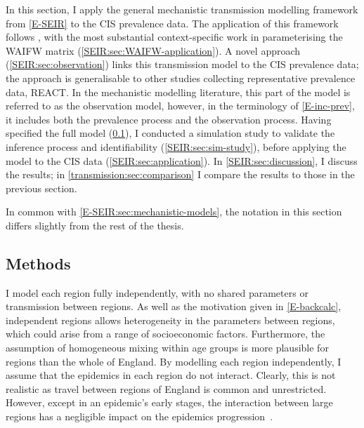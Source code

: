 \documentclass[thesis.tex]{subfiles}
\begin{document}
In this section, I apply the general mechanistic transmission modelling framework from \cref{E-SEIR} to the CIS prevalence data.
The application of this framework follows \textcite{birrellRealtime}, with the most substantial context-specific work in parameterising the WAIFW matrix (\cref{SEIR:sec:WAIFW-application}).
A novel approach (\cref{SEIR:sec:observation}) links this transmission model to the CIS prevalence data; the approach is generalisable to other studies collecting representative prevalence data, \eg REACT.
In the mechanistic modelling literature, this part of the model is referred to as the observation model, however, in the terminology of \cref{E-inc-prev}, it includes both the prevalence process and the observation process.
Having specified the full model (\cref{SEIR:sec:methods-application}), I conducted a simulation study to validate the inference process and identifiability (\cref{SEIR:sec:sim-study}), before applying the model to the CIS data (\cref{SEIR:sec:application}).
In \cref{SEIR:sec:discussion}, I discuss the results; in \cref{transmission:sec:comparison} I compare the results to those in the previous section.

In common with \cref{E-SEIR:sec:mechanistic-models}, the notation in this section differs slightly from the rest of the thesis.

\subsection{Methods} \label{SEIR:sec:methods-application}


I model each region fully independently, \ie with no shared parameters or transmission between regions.
As well as the motivation given in \cref{E-backcalc}, independent regions allows heterogeneity in the parameters between regions, which could arise from a range of socioeconomic factors.
Furthermore, the assumption of homogeneous mixing within age groups is more plausible for regions than the whole of England.
By modelling each region independently, I assume that the epidemics in each region do not interact.
Clearly, this is not realistic as travel between regions of England is common and unrestricted.
However, except in an epidemic's early stages, the interaction between large regions has a negligible impact on the epidemics progression~\autocite[e.g.][]{birrellRealtimea,gogSpatial,eggoSpatial}.
\end{document}
